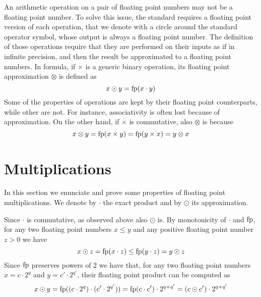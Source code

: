An arithmetic operation on a pair of floating point numbers may not be a floating point number. To solve this issue, the standard requires a floating point version of each operation, that we denote with a circle around the standard operator symbol, whose output is always a floating point number. The definition of those operations require that they are performed on their inputs as if in infinite precision, and then the result be approximated to a floating point numbers. In formula, if $\times$ is a generic binary operation, its floating point approximation $\otimes$ is defined as
\[
x \odot y = \text{fp}(x \cdot y)
\]
Some of the properties of operations are kept by their floating point counterparts, while other are not. For instance, associativity is often lost because of approximation. On the other hand, if $\times$ is commutative, also $\otimes$ is because
\[
x \otimes y = \text{fp}(x \times y) = \text{fp} (y \times x) = y \otimes x
\]

\section{Multiplications}
In this section we enunciate and prove some properties of floating point multiplications. We denote by $\cdot$ the exact product and by $\odot$ its approximation.

Since $\cdot$ is commutative, as observed above also $\odot$ is.
By monotonicity of $\cdot$ and $\text{fp}$, for any two floating point numbers $x \le y$ and any positive floating point number $z > 0$ we have
\[
x \odot z = \text{fp}(x \cdot z) \le \text{fp}(y \cdot z) = y \odot z
\]
Since $\text{fp}$ preserves powers of $2$ we have that, for any two floating point numbers $x = c \cdot 2^q$ and $y = c' \cdot 2^{q'}$, their floating point product can be computed as
\[
x \odot y = \text{fp}((c \cdot 2^q) \cdot (c' \cdot 2^{q'})) = \text{fp}(c \cdot c') \cdot 2^{q + q'} = (c \odot c') \cdot 2^{q + q'}
\]

